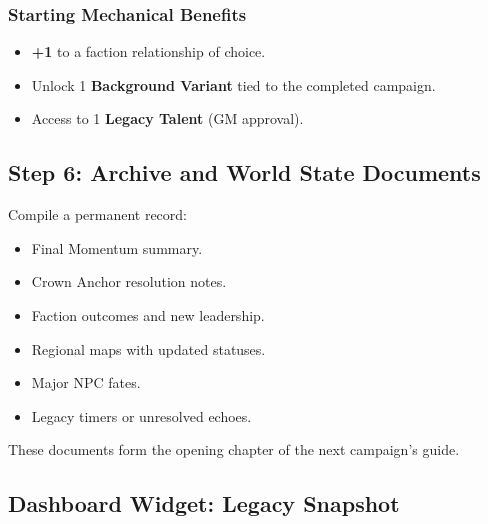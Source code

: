 \documentclass[11pt]{article}
\begin{document}
\subsubsection{Starting Mechanical Benefits}
\begin{itemize}
    \item \textbf{+1} to a faction relationship of choice.
    \item Unlock 1 \textbf{Background Variant} tied to the completed campaign.
    \item Access to 1 \textbf{Legacy Talent} (GM approval).
\end{itemize}

\subsection{Step 6: Archive and World State Documents}

Compile a permanent record:

\begin{itemize}
    \item Final Momentum summary.
    \item Crown Anchor resolution notes.
    \item Faction outcomes and new leadership.
    \item Regional maps with updated statuses.
    \item Major NPC fates.
    \item Legacy timers or unresolved echoes.
\end{itemize}

These documents form the opening chapter of the next campaign's guide.

\subsection{Dashboard Widget: Legacy Snapshot}
\end{document}
